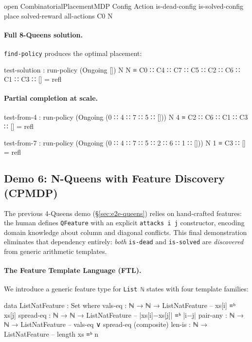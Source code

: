 \begin{spec}
open CombinatorialPlacementMDP Config Action
  is-dead-config is-solved-config place solved-reward all-actions C0 N
\end{spec}

\paragraph{Full 8-Queens solution.}  \texttt{find-policy} produces the optimal placement:
\begin{spec}
test-solution : run-policy (Ongoing []) N N
  ≡ C0 ∷ C4 ∷ C7 ∷ C5 ∷ C2 ∷ C6 ∷ C1 ∷ C3 ∷ []  = refl
\end{spec}

\paragraph{Partial completion at scale.}
\begin{spec}
test-from-4 : run-policy (Ongoing (0 ∷ 4 ∷ 7 ∷ 5 ∷ [])) N 4
  ≡ C2 ∷ C6 ∷ C1 ∷ C3 ∷ []  = refl

test-from-7 : run-policy (Ongoing (0 ∷ 4 ∷ 7 ∷ 5 ∷ 2 ∷ 6 ∷ 1 ∷ [])) N 1
  ≡ C3 ∷ []  = refl
\end{spec}


\subsection{Demo 6: N-Queens with Feature Discovery (CPMDP)}
\label{sec:e2e-auto}

The previous 4-Queens demo (\S\ref{sec:e2e-queens}) relies on hand-crafted features: the human defines \texttt{QFeature} with an explicit \texttt{attacks~i~j} constructor, encoding domain knowledge about column and diagonal conflicts.
This final demonstration eliminates that dependency entirely: \emph{both} \texttt{is-dead} and \texttt{is-solved} are \emph{discovered} from generic arithmetic templates.

\paragraph{The Feature Template Language (FTL).}
We introduce a generic feature type for \texttt{List~ℕ} states with four template families:

\begin{spec}
data ListNatFeature : Set where
  vals-eq    : ℕ → ℕ → ListNatFeature   -- xs[i] ≡ᵇ xs[j]
  spread-eq  : ℕ → ℕ → ListNatFeature   -- |xs[i]−xs[j]| ≡ᵇ |i−j|
  pair-any   : ℕ → ℕ → ListNatFeature   -- vals-eq ∨ spread-eq (composite)
  len-is     : ℕ → ListNatFeature        -- length xs ≡ᵇ n
\end{spec}

